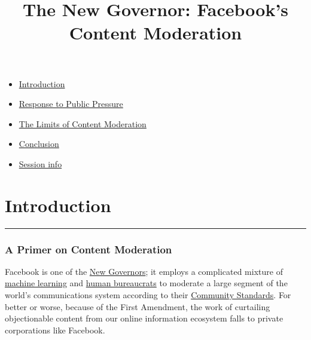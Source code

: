 \documentclass[
]{article}
\title{The New Governor: Facebook's Content Moderation}
\author{}
\date{\vspace{-2.5em}}
\providecommand{\tightlist}{%
  \setlength{\itemsep}{0pt}\setlength{\parskip}{0pt}}
\begin{document}
\maketitle

\begin{itemize}
\tightlist
\item
  \protect\hyperlink{introduction}{Introduction}
\item
  \protect\hyperlink{response-to-recent-public-pressure}{Response to
  Public Pressure}
\item
  \protect\hyperlink{the-limits-of-content-moderation}{The Limits of
  Content Moderation}
\item
  \protect\hyperlink{conclusion}{Conclusion}
\item
  \protect\hyperlink{session-info}{Session info}
\end{itemize}

\hypertarget{introduction}{%
\section{Introduction}\label{introduction}}

\begin{center}\rule{0.5\linewidth}{0.5pt}\end{center}

\hypertarget{a-primer-on-content-moderation}{%
\subsubsection{A Primer on Content
Moderation}\label{a-primer-on-content-moderation}}

Facebook is one of the
\href{https://harvardlawreview.org/wp-content/uploads/2018/04/1598-1670_Online.pdf}{New
Governors}; it employs a complicated mixture of
\href{https://www.theverge.com/2020/11/13/21562596/facebook-ai-moderation}{machine
learning} and
\href{https://www.npr.org/2020/11/18/936282353/facebook-contract-workers-demand-safer-conditions-amid-pressure-to-return-to-off}{human
bureaucrats} to moderate a large segment of the world's communications
system according to their
\href{https://www.facebook.com/communitystandards/}{Community
Standards}. For better or worse, because of the First Amendment, the
work of curtailing objectionable content from our online information
ecosystem falls to private corporations like Facebook.
\end{document}
